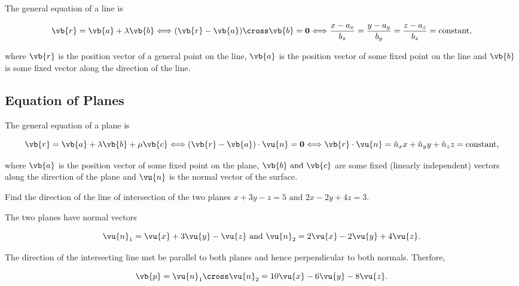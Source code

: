 \documentclass[a4paper,12pt]{report}
\begin{document}
The general equation of a line is 

\begin{equation}
    \vb{r} = \vb{a} + \lambda \vb{b} \Longleftrightarrow (\vb{r} - \vb{a} ) \cross \vb{b} = \boldsymbol{0} \Longleftrightarrow \frac{x-a_{x} }{b_{x} } = \frac{y - a_{y} }{b_{y} } = \frac{z - a_{z} }{b_{z} } = \text{constant}, 
\end{equation}

where \(\vb{r} \) is the position vector of a general point on the line, \(\vb{a} \) is the position vector of some fixed point on the line and \(\vb{b} \) is some fixed vector along the direction of the line.   

\subsection{Equation of Planes}

The general equation of a plane is 

\begin{equation}
    \vb{r} = \vb{a} + \lambda \vb{b} + \mu \vb{c} \Longleftrightarrow (\vb{r} - \vb{a} ) \cdot \vu{n} = \boldsymbol{0} \Longleftrightarrow \vb{r} \cdot \vu{n} = \hat{n}_{x} x + \hat{n}_{y} y + \hat{n}_{z} z = \text{constant} , 
\end{equation}

where \(\vb{a} \) is the position vector of some fixed point on the plane, \(\vb{b} \text { and } \vb{c} \) are some fixed (linearly independent) vectors along the direction of the plane and \(\vu{n}\) is the normal vector of the surface. 

{Find the direction of the line of intersection of the two planes \(x+3y-z=5 \text { and } 2x-2y+4z=3\). }
{The two planes have normal vectors 

\begin{equation}
    \vu{n} _{1} = \vu{x} + 3\vu{y} -\vu{z} \text { and } \vu{n} _{2} = 2\vu{x} -2\vu{y} + 4\vu{z}.
\end{equation}

The direction of the intersecting line mst be parallel to both planes and hence perpendicular to both normals. Therfore, 

\begin{equation}
    \vb{p} = \vu{n} _{1}\cross \vu{n} _{2} = 10\vu{x}-6\vu{y} -8\vu{z}.
\end{equation}
~} 
\end{document}
